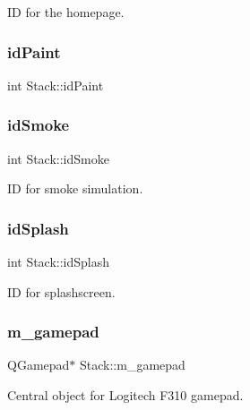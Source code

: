 ID for the homepage. 

\mbox{\label{classStack_af1ad238355f4a635bda88ca8b664dd29}} 
\subsubsection{\texorpdfstring{idPaint}{idPaint}}
{\footnotesize\ttfamily int Stack\+::id\+Paint\hspace{0.3cm}{\ttfamily [private]}}

\mbox{\label{classStack_ad4c5c03c0dde0b63650bd258183a6ed3}} 
\subsubsection{\texorpdfstring{idSmoke}{idSmoke}}
{\footnotesize\ttfamily int Stack\+::id\+Smoke\hspace{0.3cm}{\ttfamily [private]}}



ID for smoke simulation. 

\mbox{\label{classStack_a448b69ac9652860c3f94f4cf2972052f}} 
\subsubsection{\texorpdfstring{idSplash}{idSplash}}
{\footnotesize\ttfamily int Stack\+::id\+Splash\hspace{0.3cm}{\ttfamily [private]}}



ID for splashscreen. 

\mbox{\label{classStack_a63dddeeffcc3340219b93b716f9b8bc9}} 
\subsubsection{\texorpdfstring{m\_gamepad}{m\_gamepad}}
{\footnotesize\ttfamily Q\+Gamepad$\ast$ Stack\+::m\+\_\+gamepad}



Central object for Logitech F310 gamepad. 


